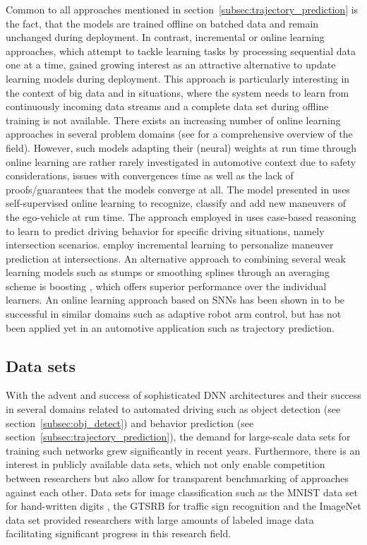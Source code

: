 Common to all approaches mentioned in section~\ref{subsec:trajectory_prediction} is the fact, that the models are trained offline on batched data and remain unchanged during deployment.
In contrast, incremental or online learning approaches, which attempt to tackle learning tasks by processing sequential data one at a time, gained growing interest as an attractive alternative to update learning models during deployment.
This approach is particularly interesting in the context of big data and in situations, where the system needs to learn from continuously incoming data streams and a complete data set during offline training is not available.
There exists an increasing number of online learning approaches in several problem domains (see \textcites{Losing2018}{Gomes2017}{Hoi2018} for a comprehensive overview of the field).
However, such models adapting their (neural) weights at run time through online learning are rather rarely investigated in automotive context due to safety considerations, issues with convergences time as well as the lack of proofs/guarantees that the models converge at all.
The model presented in \textcite{Maye2011} uses self-supervised online learning to recognize, classify and add new maneuvers of the ego-vehicle at run time.
The approach employed in \textcite{Graf2014} uses case-based reasoning to learn to predict driving behavior for specific driving situations, namely intersection scenarios.
\textcite{Losing2017} employ incremental learning to personalize maneuver prediction at intersections.
An alternative approach to combining several weak learning models such as stumps or smoothing splines through an averaging scheme is boosting \parencite{Taieb2014}, which offers superior performance over the individual learners.
An online learning approach based on \acp{SNN} has been shown in \textcite{DeWolf2016} to be successful in similar domains such as adaptive robot arm control, but has not been applied yet in an automotive application such as trajectory prediction.

\subsection{Data sets}%
\label{subsec:data_sets}

With the advent and success of sophisticated \ac{DNN} architectures and their success in several domains related to automated driving such as object detection (see section~\ref{subsec:obj_detect}) and behavior prediction (see section~\ref{subsec:trajectory_prediction}), the demand for large-scale data sets for training such networks grew significantly in recent years.
Furthermore, there is an interest in publicly available data sets, which not only enable competition between researchers but also allow for transparent benchmarking of approaches against each other.
Data sets for image classification such as the \ac{MNIST} data set for hand-written digits \parencite{LeCun1998} , the \ac{GTSRB} for traffic sign recognition \parencite{Stallkamp2012} and the ImageNet data set \parencite{Deng2009} provided researchers with large amounts of labeled image data facilitating significant progress in this research field.


